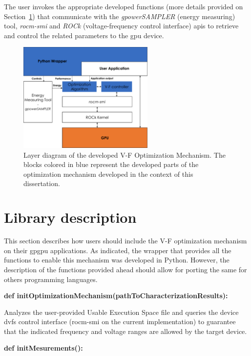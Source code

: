 The user invokes the appropriate developed functions (more details provided on Section~\ref{sec:usage}) that communicate with the \textit{gpowerSAMPLER} (energy measuring) tool, \textit{rocm-smi} and \textit{ROCk} (voltage-frequency control interface) \acrshort{api}s to retrieve and control the related parameters to the \acrshort{gpu} device. 

\begin{figure}[htb]
  \centering
  \includegraphics[width=0.6\textwidth]{Figures/Optimization/layerDiagram.pdf}
  \caption{Layer diagram of the developed V-F Optimization Mechanism. The blocks colored in blue represent the developed parts of the optimization mechanism developed in the context of this dissertation.}
  \label{fig:layer}
\end{figure}


\section{Library description}
\label{sec:usage}

This section describes how users should include the V-F optimization mechanism on their \acrshort{gpgpu} applications. As indicated, the wrapper that provides all the functions to enable this mechanism was developed in Python. However, the description of the functions provided ahead should allow for porting the same for others programming languages.

\textbf{def initOptimizationMechanism(pathToCharacterizationResults):}

Analyzes the user-provided Usable Execution Space file and queries the device \acrshort{dvfs} control interface (rocm-smi on the current implementation) to guarantee that the indicated frequency and voltage ranges are allowed by the target device.

\textbf{def initMesurements():}

